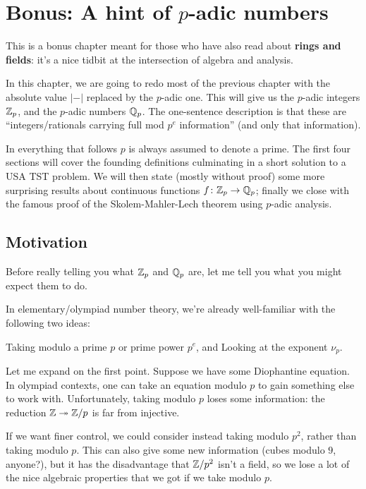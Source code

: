 \chapter[Bonus: A hint of p-adic numbers]{Bonus: A hint of $p$-adic numbers}
This is a bonus chapter meant for those
who have also read about \textbf{rings and fields}:
it's a nice tidbit at the intersection of algebra and analysis.


In this chapter, we are going to redo most of the previous chapter
with the absolute value $\left\lvert - \right\rvert$
replaced by the $p$-adic one.
This will give us the $p$-adic integers $\mathbb Z_p$,
and the $p$-adic numbers $\mathbb Q_p$.
The one-sentence description is that these are
``integers/rationals carrying full mod $p^e$ information''
(and only that information).

In everything that follows $p$ is always assumed to denote a prime.
The first four sections will cover the founding definitions
culminating in a short solution to a USA TST problem.
We will then state (mostly without proof) some more
surprising results about continuous functions $f \colon \mathbb Z_p \to \mathbb Q_p$;
finally we close with the famous proof of the Skolem-Mahler-Lech theorem
using $p$-adic analysis.

\section{Motivation}
Before really telling you what $\mathbb Z_p$ and $\mathbb Q_p$ are,
let me tell you what you might expect them to do.

In elementary/olympiad number theory,
we're already well-familiar with the following two ideas:
\begin{itemize}
	\ii Taking modulo a prime $p$ or prime power $p^e$, and
	\ii Looking at the exponent $\nu_p$.
\end{itemize}

Let me expand on the first point.
Suppose we have some Diophantine equation.
In olympiad contexts, one can take an equation modulo $p$
to gain something else to work with.
Unfortunately, taking modulo $p$ loses some information:
the reduction $\mathbb Z \twoheadrightarrow \mathbb Z/p$ is far from injective.

If we want finer control, we could consider instead
taking modulo $p^2$, rather than taking modulo $p$.
This can also give some new information (cubes modulo $9$, anyone?),
but it has the disadvantage that $\mathbb Z/p^2$ isn't a field,
so we lose a lot of the nice algebraic properties that we
got if we take modulo $p$.


